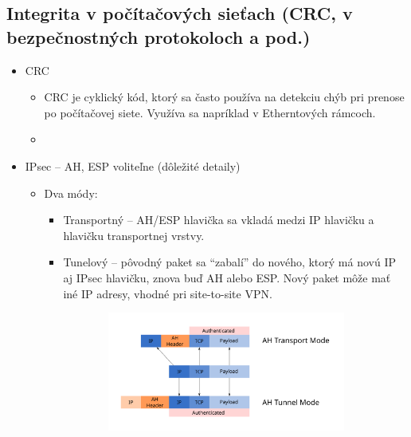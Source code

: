 \documentclass[12pt,a4paper]{article}
\begin{document}
{    \subsection{Integrita v počítačových sieťach (CRC, v bezpečnostných protokoloch a pod.)}
    \begin{itemize}
        \item CRC
        \begin{itemize}
            \item CRC je cyklický kód, ktorý sa často používa na detekciu chýb pri prenose po počítačovej siete. Využíva sa napríklad v Etherntových rámcoch.
            \item 
        \end{itemize}
        \item IPsec -- AH, ESP voliteľne (dôležité detaily)
        \begin{itemize}
            \item Dva módy:
            \begin{itemize}
                \item Transportný -- AH/ESP hlavička sa vkladá medzi IP hlavičku a hlavičku transportnej vrstvy.
                \item Tunelový -- pôvodný paket sa ``zabalí'' do nového, ktorý má novú IP aj IPsec hlavičku, znova buď AH alebo ESP. Nový paket môže mať iné IP adresy, vhodné pri site-to-site VPN.
            \end{itemize}
            \begin{figure}[htbp]
              \centering
              \begin{subfigure}[b]{0.7\textwidth}
                \centering
                \includegraphics[width=\textwidth]{Ipsec-ah.svg.png}
                \label{fig:image1}
              \end{subfigure}
              \hfill
              \begin{subfigure}[b]{0.8\textwidth}

\end{subfigure}
\end{figure}
\end{itemize}
\end{itemize}}
\end{document}
